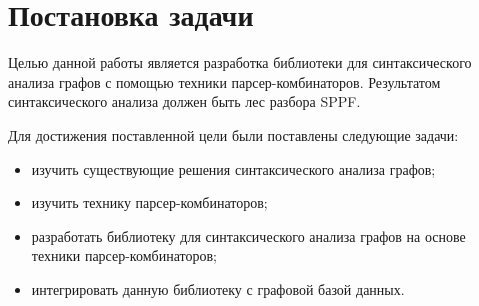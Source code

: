 \section{Постановка задачи}
Целью данной работы является разработка библиотеки для синтаксического анализа графов с помощью техники парсер-комбинаторов. Результатом синтаксического анализа должен быть лес разбора SPPF.

Для достижения поставленной цели были поставлены следующие задачи:

\begin{itemize}  
\item изучить существующие решения синтаксического анализа графов;
\item изучить технику парсер-комбинаторов;
\item разработать библиотеку для синтаксического анализа графов на основе техники парсер-комбинаторов;
\item интегрировать данную библиотеку с графовой базой данных.
\end{itemize}